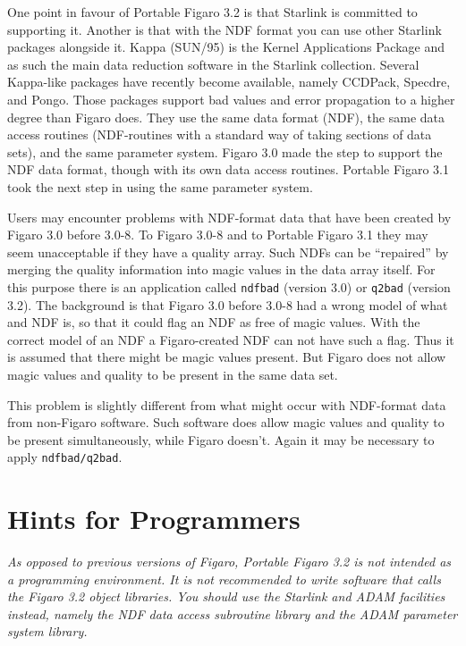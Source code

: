 One point in favour of Portable Figaro 3.2 is that Starlink is
committed to supporting it.  Another is that with the NDF format you can
use other Starlink packages alongside it.  Kappa (SUN/95) is the Kernel
Applications Package and as such the main data reduction software in the
Starlink collection.  Several Kappa-like packages have recently become
available, namely CCDPack, Specdre, and Pongo.  Those packages support
bad values and error propagation to a higher degree than Figaro does.
They use the same data format (NDF), the same data access routines
(NDF-routines with a standard way of taking sections of data sets), and
the same parameter system.  Figaro 3.0 made the step to support the NDF
data format, though with its own data access routines. Portable Figaro
3.1 took the next step in using the same parameter system.

Users may encounter problems with NDF-format data that have been
created by Figaro 3.0 before 3.0-8. To Figaro 3.0-8 and to Portable
Figaro 3.1 they may seem unacceptable if they have a quality array. Such
NDFs can be ``repaired'' by merging the quality information into magic
values in the data array itself. For this purpose there is an
application called {\tt ndfbad} (version 3.0) or {\tt q2bad} (version
3.2).  The background is that Figaro 3.0 before 3.0-8 had a wrong model
of what and NDF is, so that it could flag an NDF as free of magic
values. With the correct model of an NDF a Figaro-created NDF can not
have such a flag. Thus it is assumed that there might be magic values
present.  But Figaro does not allow magic values and quality to be
present in the same data set.

This problem is slightly different from what might occur with NDF-format
data from non-Figaro software. Such software does allow magic values and
quality to be present simultaneously, while Figaro doesn't. Again it may
be necessary to apply {\tt ndfbad/q2bad}.


\section{Hints for Programmers}
\label{proghint}

{\it As opposed to previous versions of Figaro,
Portable Figaro 3.2 is not intended as a
programming environment. It is not recommended to write software that calls
the Figaro 3.2 object libraries. You should use the Starlink and ADAM
facilities instead, namely the NDF data access subroutine library and the ADAM
parameter system library.}

